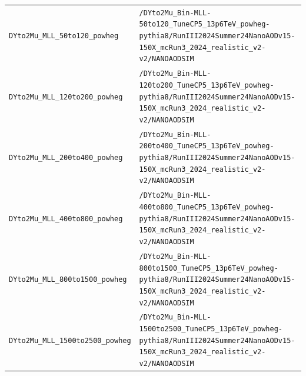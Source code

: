 \begin{longtable}{@{}>{\RaggedRight\arraybackslash}p{} >{\RaggedRight\arraybackslash}p{}@{}}
\addlinespace[2pt]
\texttt{DYto2Mu\_\allowbreak{}MLL\_\allowbreak{}50to120\_\allowbreak{}powheg} & \texttt{/\allowbreak{}DYto2Mu\_\allowbreak{}Bin-\allowbreak{}MLL-\allowbreak{}50to120\_\allowbreak{}TuneCP5\_\allowbreak{}13p6TeV\_\allowbreak{}powheg-\allowbreak{}pythia8/\allowbreak{}RunIII2024Summer24NanoAODv15-\allowbreak{}150X\_\allowbreak{}mcRun3\_\allowbreak{}2024\_\allowbreak{}realistic\_\allowbreak{}v2-\allowbreak{}v2/\allowbreak{}NANOAODSIM} \\
\addlinespace[2pt]
\texttt{DYto2Mu\_\allowbreak{}MLL\_\allowbreak{}120to200\_\allowbreak{}powheg} & \texttt{/\allowbreak{}DYto2Mu\_\allowbreak{}Bin-\allowbreak{}MLL-\allowbreak{}120to200\_\allowbreak{}TuneCP5\_\allowbreak{}13p6TeV\_\allowbreak{}powheg-\allowbreak{}pythia8/\allowbreak{}RunIII2024Summer24NanoAODv15-\allowbreak{}150X\_\allowbreak{}mcRun3\_\allowbreak{}2024\_\allowbreak{}realistic\_\allowbreak{}v2-\allowbreak{}v2/\allowbreak{}NANOAODSIM} \\
\addlinespace[2pt]
\texttt{DYto2Mu\_\allowbreak{}MLL\_\allowbreak{}200to400\_\allowbreak{}powheg} & \texttt{/\allowbreak{}DYto2Mu\_\allowbreak{}Bin-\allowbreak{}MLL-\allowbreak{}200to400\_\allowbreak{}TuneCP5\_\allowbreak{}13p6TeV\_\allowbreak{}powheg-\allowbreak{}pythia8/\allowbreak{}RunIII2024Summer24NanoAODv15-\allowbreak{}150X\_\allowbreak{}mcRun3\_\allowbreak{}2024\_\allowbreak{}realistic\_\allowbreak{}v2-\allowbreak{}v2/\allowbreak{}NANOAODSIM} \\
\addlinespace[2pt]
\texttt{DYto2Mu\_\allowbreak{}MLL\_\allowbreak{}400to800\_\allowbreak{}powheg} & \texttt{/\allowbreak{}DYto2Mu\_\allowbreak{}Bin-\allowbreak{}MLL-\allowbreak{}400to800\_\allowbreak{}TuneCP5\_\allowbreak{}13p6TeV\_\allowbreak{}powheg-\allowbreak{}pythia8/\allowbreak{}RunIII2024Summer24NanoAODv15-\allowbreak{}150X\_\allowbreak{}mcRun3\_\allowbreak{}2024\_\allowbreak{}realistic\_\allowbreak{}v2-\allowbreak{}v2/\allowbreak{}NANOAODSIM} \\
\addlinespace[2pt]
\texttt{DYto2Mu\_\allowbreak{}MLL\_\allowbreak{}800to1500\_\allowbreak{}powheg} & \texttt{/\allowbreak{}DYto2Mu\_\allowbreak{}Bin-\allowbreak{}MLL-\allowbreak{}800to1500\_\allowbreak{}TuneCP5\_\allowbreak{}13p6TeV\_\allowbreak{}powheg-\allowbreak{}pythia8/\allowbreak{}RunIII2024Summer24NanoAODv15-\allowbreak{}150X\_\allowbreak{}mcRun3\_\allowbreak{}2024\_\allowbreak{}realistic\_\allowbreak{}v2-\allowbreak{}v2/\allowbreak{}NANOAODSIM} \\
\addlinespace[2pt]
\texttt{DYto2Mu\_\allowbreak{}MLL\_\allowbreak{}1500to2500\_\allowbreak{}powheg} & \texttt{/\allowbreak{}DYto2Mu\_\allowbreak{}Bin-\allowbreak{}MLL-\allowbreak{}1500to2500\_\allowbreak{}TuneCP5\_\allowbreak{}13p6TeV\_\allowbreak{}powheg-\allowbreak{}pythia8/\allowbreak{}RunIII2024Summer24NanoAODv15-\allowbreak{}150X\_\allowbreak{}mcRun3\_\allowbreak{}2024\_\allowbreak{}realistic\_\allowbreak{}v2-\allowbreak{}v2/\allowbreak{}NANOAODSIM} \\

\end{longtable}
